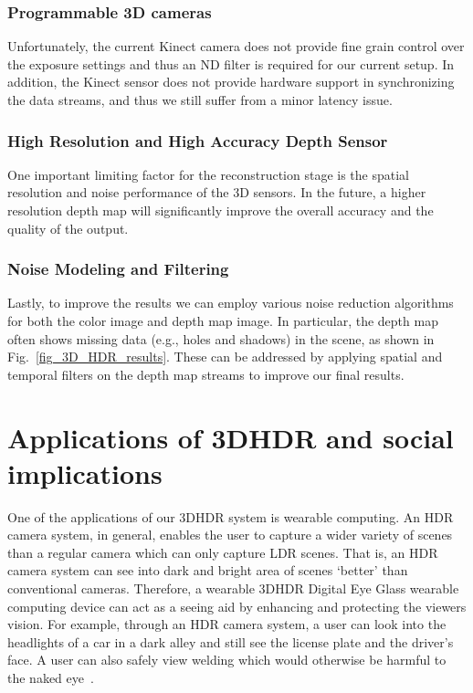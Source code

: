 \subsubsection{Programmable 3D cameras}
Unfortunately, the current Kinect camera does not provide fine grain control over the exposure settings and thus an ND filter is required for our current setup. In addition, the Kinect sensor does not provide hardware support in synchronizing the data streams, and thus we still suffer from a minor latency issue. 

\subsubsection{High Resolution and High Accuracy Depth Sensor}
One important limiting factor for the reconstruction stage is the spatial resolution and noise performance of the 3D sensors. In the future, a higher resolution depth map will significantly improve the overall accuracy and the quality of the output.

\subsubsection{Noise Modeling and Filtering}
Lastly, to improve the results we can employ various noise reduction algorithms for both the color image and depth map image. In particular, the depth map often shows missing data (e.g., holes and shadows) in the scene, as shown in Fig.~\ref{fig_3D_HDR_results}. These can be addressed by applying spatial and temporal filters \cite{matyunin2011temporal} on the depth map streams to improve our final results.

\section{Applications of 3DHDR and social implications}
One of the applications of our 3DHDR system is wearable computing.
An HDR camera system, in general, enables the user to capture a wider variety
of scenes than a regular camera which can only capture LDR scenes. That is,
an HDR camera system can see into dark and bright area of scenes `better' than
conventional cameras. Therefore, a wearable 3DHDR Digital Eye Glass wearable computing
device can act as a seeing aid by enhancing and protecting the viewers vision.
For example, through an HDR camera system, a user can look into the headlights
of a car in a dark alley and still see the license plate and the driver's face.
A user can also safely view welding
which would otherwise be harmful to the naked eye~\cite{mann2012hdrchitecture}.%

